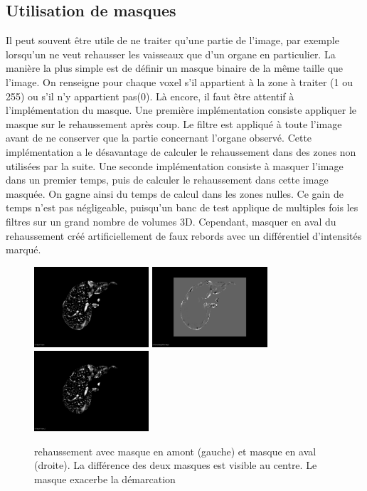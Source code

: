 \subsection{Utilisation de masques}

Il peut souvent être utile de ne traiter qu'une partie de l'image, par exemple lorsqu'un ne veut rehausser les vaisseaux que d'un organe en particulier. La manière la plus simple est de définir un masque binaire de la même taille que l'image. On renseigne pour chaque voxel s'il appartient à la zone à traiter (1 ou 255) ou s'il n'y appartient pas(0). Là encore, il faut être attentif à l'implémentation du masque. Une première implémentation consiste appliquer le masque sur le rehaussement après coup. Le filtre est appliqué à toute l'image avant de ne conserver que la partie concernant l'organe observé. Cette implémentation a le désavantage de calculer le rehaussement dans des zones non utilisées par la suite. Une seconde implémentation consiste à masquer l'image dans un premier temps, puis de calculer le rehaussement dans cette image masquée. On gagne ainsi du temps de calcul dans les zones nulles. Ce gain de temps n'est pas négligeable, puisqu'un banc de test applique de multiples fois les filtres sur un grand nombre de volumes 3D. Cependant, masquer en aval du rehaussement créé artificiellement de faux rebords avec un différentiel d'intensités marqué.
 
\begin{figure}
  \centering
  \includegraphics[height=3cm]{Images/output_maskedFirst.png}
  \includegraphics[height=3cm]{Images/output_masking_diff.png}
  \includegraphics[height=3cm]{Images/output_unmasked.png}
  \label{fig:mask_intensity_profile}
  \caption{rehaussement avec masque en amont (gauche) et masque en aval (droite). La différence des deux masques est visible au centre. Le masque exacerbe la démarcation}
\end{figure}

